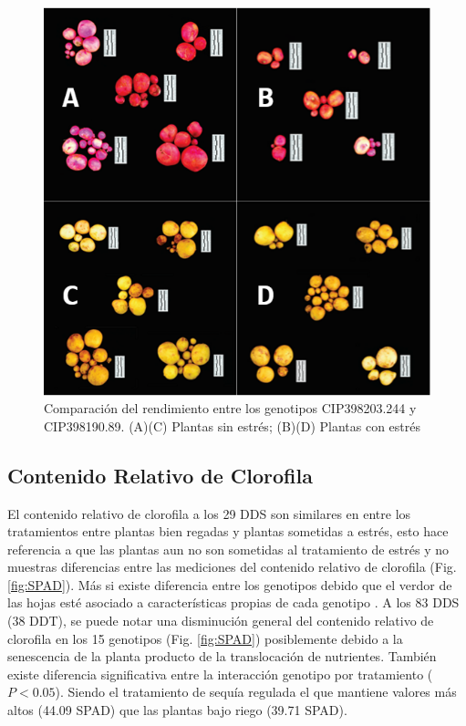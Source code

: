 \documentclass[fleqn,10pt]{Flavio}\usepackage[]{graphicx}\usepackage[]{color}
\begin{document}
\begin{figure}[ht]\centering
\includegraphics[width=\linewidth]{tubpic}
\caption{Comparaci\'on del rendimiento entre los genotipos CIP398203.244 y CIP398190.89. (A)(C) Plantas sin estr\'es; (B)(D) Plantas con estr\'es}
\label{fig:tpic}
\end{figure}

\subsection{Contenido Relativo de Clorofila}  

El contenido relativo de clorofila a los 29 DDS son similares en entre los tratamientos entre plantas bien regadas y plantas sometidas a estr\'es, esto hace referencia a que las plantas aun no son sometidas al tratamiento de estr\'es y no muestras diferencias entre las mediciones del contenido relativo de clorofila (Fig. \ref{fig:SPAD}). M\'as si existe diferencia entre los genotipos debido que el verdor de las hojas est\'e asociado a caracter\'isticas propias de cada genotipo \citep{THOMAS1993}. A los 83 DDS (38 DDT), se puede notar una disminuci\'on general del contenido relativo de clorofila en los 15 genotipos (Fig. \ref{fig:SPAD}) posiblemente debido a la senescencia de la planta producto de la translocaci\'on de nutrientes. Tambi\'en existe diferencia significativa entre la interacci\'on genotipo por tratamiento ($P<0.05$). Siendo el tratamiento de sequ\'ia regulada el que mantiene valores m\'as altos (44.09 SPAD) que las plantas bajo riego (39.71 SPAD).
\end{document}
